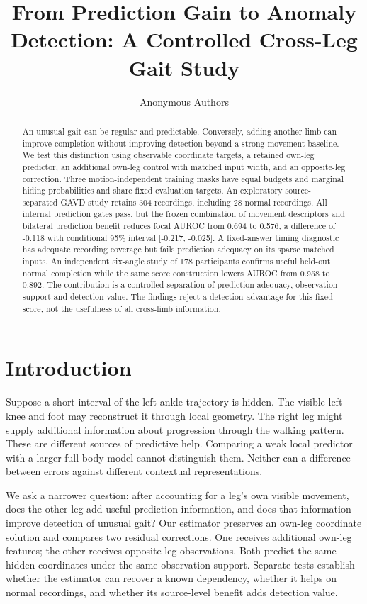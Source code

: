 \documentclass[letterpaper]{article}
\title{From Prediction Gain to Anomaly Detection: A Controlled Cross-Leg Gait Study}
\author{Anonymous Authors}
\begin{document}
\maketitle
\begin{abstract}
An unusual gait can be regular and predictable. Conversely, adding another limb can improve completion without improving detection beyond a strong movement baseline. We test this distinction using observable coordinate targets, a retained own-leg predictor, an additional own-leg control with matched input width, and an opposite-leg correction. Three motion-independent training masks have equal budgets and marginal hiding probabilities and share fixed evaluation targets. An exploratory source-separated GAVD study retains 304 recordings, including 28 normal recordings. All internal prediction gates pass, but the frozen combination of movement descriptors and bilateral prediction benefit reduces focal AUROC from 0.694 to 0.576, a difference of -0.118 with conditional 95\% interval {[}-0.217, -0.025{]}. A fixed-answer timing diagnostic has adequate recording coverage but fails prediction adequacy on its sparse matched inputs. An independent six-angle study of 178 participants confirms useful held-out normal completion while the same score construction lowers AUROC from 0.958 to 0.892. The contribution is a controlled separation of prediction adequacy, observation support and detection value. The findings reject a detection advantage for this fixed score, not the usefulness of all cross-limb information.
\end{abstract}
\section{Introduction}

Suppose a short interval of the left ankle trajectory is hidden. The visible left knee and foot may reconstruct it through local geometry. The right leg might supply additional information about progression through the walking pattern. These are different sources of predictive help. Comparing a weak local predictor with a larger full-body model cannot distinguish them. Neither can a difference between errors against different contextual representations.

We ask a narrower question: after accounting for a leg's own visible movement, does the other leg add useful prediction information, and does that information improve detection of unusual gait? Our estimator preserves an own-leg coordinate solution and compares two residual corrections. One receives additional own-leg features; the other receives opposite-leg observations. Both predict the same hidden coordinates under the same observation support. Separate tests establish whether the estimator can recover a known dependency, whether it helps on normal recordings, and whether its source-level benefit adds detection value.
\end{document}
